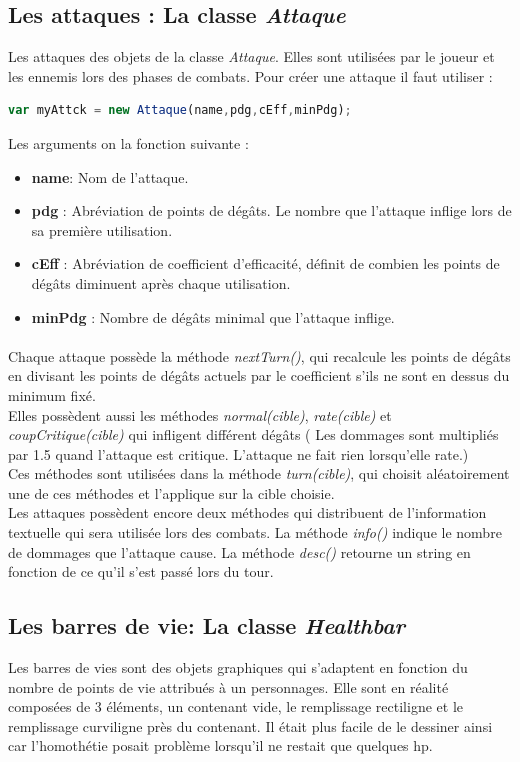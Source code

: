 \documentclass[11pt]{article}
\begin{document}
\begin{appendices}
\subsection{Les attaques : La classe \textit{Attaque}}
Les attaques des objets de la classe \textit{Attaque}. Elles sont utilisées par le joueur et les ennemis lors des phases de combats. Pour créer une attaque il faut utiliser : 
\begin{lstlisting}[language=JavaScript]
var myAttck = new Attaque(name,pdg,cEff,minPdg);
\end{lstlisting} 
Les arguments on la fonction suivante : 
\begin{itemize}
\item \textbf{name}: Nom de l'attaque.
\item \textbf{pdg} : Abréviation de points de dégâts. Le nombre que l'attaque inflige lors de sa première utilisation.
\item \textbf{cEff} : Abréviation de coefficient d'efficacité, définit de combien les points de dégâts diminuent après chaque utilisation.
\item \textbf{minPdg} : Nombre de dégâts minimal que l'attaque inflige.
\end{itemize}
\paragraph{}

Chaque attaque possède la méthode \textit{nextTurn()}, qui recalcule les points de dégâts en divisant les points de dégâts actuels par le coefficient s'ils ne sont en dessus du minimum fixé.\\

Elles possèdent aussi les méthodes \textit{normal(cible)}, \textit{rate(cible)} et \textit{coupCritique(cible)} qui infligent différent dégâts ( Les dommages sont multipliés par 1.5 quand l'attaque est critique. L'attaque ne fait rien lorsqu'elle rate.)\\
Ces méthodes sont utilisées dans la méthode \textit{turn(cible)}, qui choisit aléatoirement une de ces méthodes et l'applique sur la cible choisie. \\

Les attaques possèdent encore deux méthodes qui distribuent de l'information textuelle qui sera utilisée lors des combats. La méthode \textit{info()} indique le nombre de dommages que l'attaque cause. La méthode \textit{desc()} retourne un string en fonction de ce qu'il s'est passé lors du tour.
\subsection{Les barres de vie: La classe \textit{Healthbar}}
Les barres de vies sont des objets graphiques qui s'adaptent en fonction du nombre de points de vie attribués à un personnages. Elle sont en réalité composées de 3 éléments, un contenant vide, le remplissage rectiligne et le remplissage curviligne près du contenant. Il était plus facile de le dessiner ainsi car l'homothétie posait problème lorsqu'il ne restait que quelques hp. \\


\end{appendices}
\end{document}
